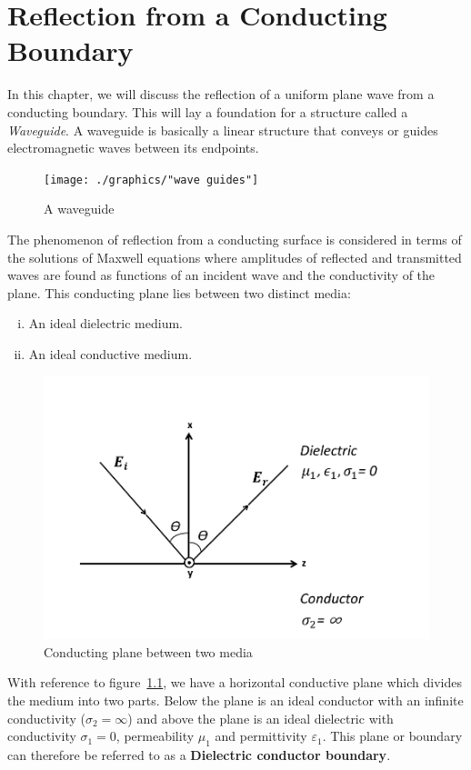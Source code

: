 \chapter{Reflection from a Conducting Boundary}\label{lec:lec34}
In this chapter, we will discuss the reflection of a uniform plane wave from a conducting boundary. This will lay a foundation for a structure called a \emph{Waveguide}. A waveguide is basically a linear structure that conveys or guides electromagnetic waves between its endpoints.
\begin{figure}[h]
\centering
\texttt{[image: ./graphics/"wave guides"]}
\caption{A waveguide}
\end{figure}

The phenomenon of reflection from a conducting surface is considered in terms of the solutions of Maxwell equations where amplitudes of reflected and transmitted waves are found as functions of an incident wave and the conductivity of the plane. This conducting plane lies between two distinct media: 
\begin{enumerate}[(i)]
\item An ideal dielectric medium.
\item An ideal conductive medium.
\end{enumerate}
\begin{figure}[h]
\centering
\includegraphics[width=1\linewidth]{./graphics/dielectric_conductor_boundary}
\caption{Conducting plane between two media}
\label{fig:plane}
\end{figure}

With reference to figure~\ref{fig:plane}, we have a horizontal conductive plane which divides the medium into two parts. Below the plane is an ideal conductor with an infinite conductivity ($\sigma _2 =\infty$) and above the plane is an ideal dielectric with conductivity $\sigma_1 = 0$, permeability $\mu _1$ and	permittivity $ \varepsilon _1$. This plane or boundary can therefore be referred to as a \textbf{Dielectric conductor boundary}.
 
